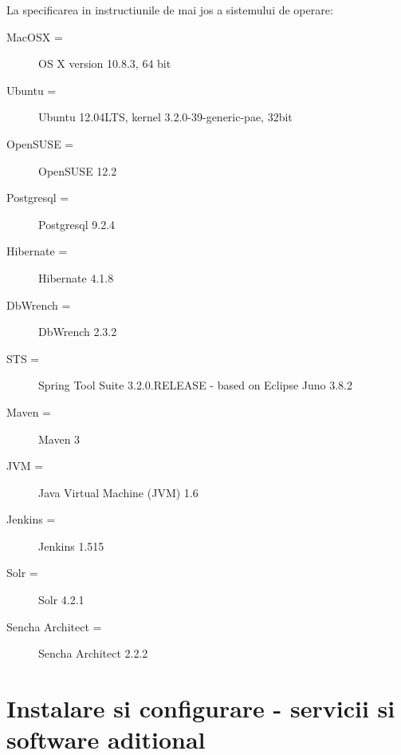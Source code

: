 La specificarea in instructiunile de mai jos a sistemului de operare:
\begin{description} 
\item [MacOSX =] OS X version 10.8.3, 64 bit
\item [Ubuntu =] Ubuntu 12.04LTS, kernel 3.2.0-39-generic-pae, 32bit
\item [OpenSUSE = ] OpenSUSE 12.2
\item [Postgresql =] Postgresql 9.2.4
\item [Hibernate =] Hibernate 4.1.8
\item [DbWrench =] DbWrench 2.3.2
\item [STS =] Spring Tool Suite 3.2.0.RELEASE - based on Eclipse Juno 3.8.2
\item [Maven =] Maven 3
\item [JVM =] Java Virtual Machine (JVM) 1.6
\item [Jenkins =] Jenkins 1.515
\item [Solr =] Solr 4.2.1
\item [Sencha Architect =] Sencha Architect 2.2.2
\end{description}

\section{Instalare si configurare - servicii si software aditional}

